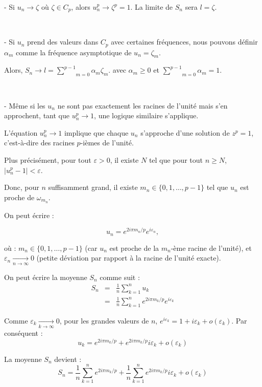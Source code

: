 
- Si $u_n \to \zeta$ o{\`u} $\zeta \in C_p$, alors $u_n^p \to \zeta^p = 1$. La
limite de $S_n$ sera $l = \zeta$.

\

- Si $u_n$ prend des valeurs dans $C_p$ avec certaines fr{\'e}quences, nous
pouvons d{\'e}finir $\alpha_m$ comme la fr{\'e}quence asymptotique de $u_n =
\zeta_m$.

Alors, $S_n \to l = \underset{m = 0}{\overset{p - 1}{\sum}} \alpha_m \zeta_m$.
avec $\alpha_m \geq 0$ et $\underset{m = 0}{\overset{p - 1}{\sum}} \alpha_m =
1$.

\

- M{\^e}me si les $u_n$ ne sont pas exactement les racines de l'unit{\'e}
mais s'en approchent, tant que $u_n^p \to 1$, une logique similaire
s'applique.

L'{\'e}quation $u_n^p \to 1$ implique que chaque $u_n$ s'approche d'une
solution de $z^p = 1$, c'est-{\`a}-dire des racines $p$-i{\`e}mes de
l'unit{\'e}.

Plus pr{\'e}cis{\'e}ment, pour tout $\varepsilon > 0$, il existe $N$ tel que
pour tout $n \geq N$, $\mid u_n^p - 1 \mid < \varepsilon$.

Donc, pour $n$ suffisamment grand, il existe $m_n \in \{ 0, 1, \ldots, p - 1
\}$ tel que $u_n$ est proche de $\omega_{m_n}$.

On peut {\'e}crire :


\[ u_n = e^{2 i \pi m_n / p} e^{i \varepsilon_n}, \]


o{\`u} : $m_n \in \{0, 1, \ldots, p - 1\}$ (car $u_n$ est proche de la
$m_n$-{\`e}me racine de l'unit{\'e}), et $\varepsilon_n  \underset{n \to
\infty}{\to} 0$ (petite d{\'e}viation par rapport {\`a} la racine de
l'unit{\'e} exacte).

On peut {\'e}crire la moyenne $S_n$ comme suit :
\begin{eqnarray*}
  S_n & = & \frac{1}{n}  \sum_{k = 1}^n u_k\\
  & = & \frac{1}{n}  \sum_{k = 1}^n e^{2 i \pi m_k / p} e^{i \varepsilon_k}
\end{eqnarray*}


Comme $\varepsilon_k  \underset{k \to \infty}{\to} 0$, pour les grandes
valeurs de $n$, $e^{i \varepsilon_k} = 1 + i \varepsilon_k + o
(\varepsilon_k)$. Par cons{\'e}quent :
\[ u_k = e^{2 i \pi m_k / p} + e^{2 i \pi m_k / p} i \varepsilon_k + o
   (\varepsilon_k) \]


La moyenne $S_n$ devient :
\[ S_n = \frac{1}{n}  \sum_{k = 1}^n e^{2 i \pi m_k / p} + \frac{1}{n} 
   \sum_{k = 1}^n e^{2 i \pi m_k / p} i \varepsilon_k + o (\varepsilon_k) \]


